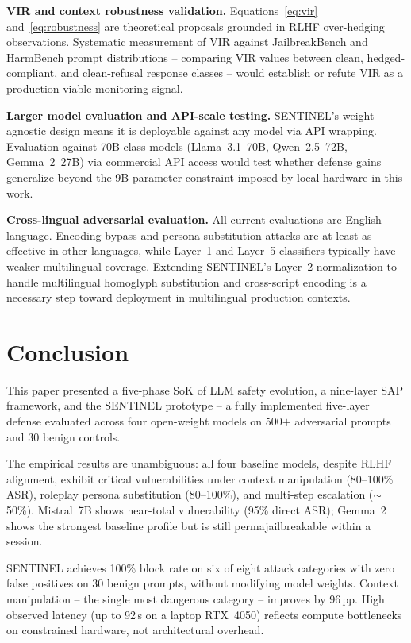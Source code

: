 \documentclass[conference]{IEEEtran}
\begin{document}
\textbf{VIR and context robustness validation.}
Equations~\eqref{eq:vir} and~\eqref{eq:robustness} are theoretical proposals
grounded in RLHF over-hedging observations.
Systematic measurement of VIR against JailbreakBench and HarmBench prompt
distributions -- comparing VIR values between clean, hedged-compliant, and
clean-refusal response classes -- would establish or refute VIR as a
production-viable monitoring signal.

\textbf{Larger model evaluation and API-scale testing.}
SENTINEL's weight-agnostic design means it is deployable against any model
via API wrapping.
Evaluation against 70B-class models (Llama~3.1~70B, Qwen~2.5~72B,
Gemma~2~27B) via commercial API access would test whether defense gains
generalize beyond the 9B-parameter constraint imposed by local hardware
in this work.

\textbf{Cross-lingual adversarial evaluation.}
All current evaluations are English-language.
Encoding bypass and persona-substitution attacks are at least as effective in
other languages, while Layer~1 and Layer~5 classifiers typically have weaker
multilingual coverage.
Extending SENTINEL's Layer~2 normalization to handle multilingual
homoglyph substitution and cross-script encoding is a necessary step toward
deployment in multilingual production contexts.

\section{Conclusion}
\label{sec:conclusion}

This paper presented a five-phase SoK of LLM safety evolution, a nine-layer
SAP framework, and the SENTINEL prototype -- a fully implemented five-layer
defense evaluated across four open-weight models on 500$+$ adversarial prompts
and 30 benign controls.

The empirical results are unambiguous: all four baseline models, despite
RLHF alignment, exhibit critical vulnerabilities under context manipulation
(80--100\% ASR), roleplay persona substitution (80--100\%), and multi-step
escalation ($\sim$50\%).
Mistral~7B shows near-total vulnerability (95\% direct ASR); Gemma~2 shows
the strongest baseline profile but is still permajailbreakable within a
session.

SENTINEL achieves 100\% block rate on six of eight attack categories with zero
false positives on 30 benign prompts, without modifying model weights.
Context manipulation -- the single most dangerous category -- improves by
96\,pp.
High observed latency (up to 92\,s on a laptop RTX~4050) reflects compute
bottlenecks on constrained hardware, not architectural overhead.
\end{document}
